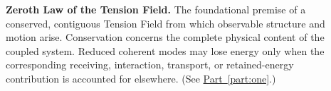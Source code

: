 \begin{description}
\item[] \begin{minipage}[t]{\linewidth}
\textbf{Zeroth Law of the Tension Field.} The foundational premise of a conserved, contiguous Tension Field from which observable structure and motion arise. Conservation concerns the complete physical content of the coupled system. Reduced coherent modes may lose energy only when the corresponding receiving, interaction, transport, or retained-energy contribution is accounted for elsewhere.
(See \hyperref[part:one]{Part~\ref*{part:one}}.)
\end{minipage}

\end{description}
